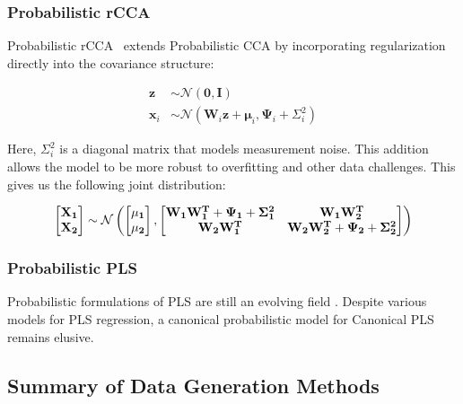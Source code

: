 \subsubsection{Probabilistic rCCA}

Probabilistic rCCA~\cite{de2003regularization} extends Probabilistic CCA by incorporating regularization directly into the covariance structure:

\begin{align}
    \mathbf{z}& \sim \mathcal{N}(\mathbf{0}, \mathbf{I})                                            \\
    \mathbf{x}_i & \sim \mathcal{N}(\mathbf{W}_i \mathbf{z} + \boldsymbol{\mu}_i, \boldsymbol{\Psi}_i + \Sigma_i^2)
\end{align}

Here, \(\Sigma_i^2\) is a diagonal matrix that models measurement noise. This addition allows the model to be more
robust to overfitting and other data challenges. This gives us the following joint distribution:

\begin{align}
    \begin{bmatrix} \bold{X_1} \\ \bold{X_2} \end{bmatrix} \sim \mathcal{N} \left( \begin{bmatrix} \bold{\mu_1} \\ \bold{\mu_2} \end{bmatrix}, \begin{bmatrix} \bold{W_1W_1^T} + \bold{\Psi_1} + \bold{\Sigma_1^2} & \bold{W_1W_2^T} \\ \bold{W_2W_1^T} & \bold{W_2W_2^T} + \bold{\Psi_2} + \bold{\Sigma_2^2} \end{bmatrix} \right)
\end{align}

\subsubsection{Probabilistic PLS}

Probabilistic formulations of PLS are still an evolving field \cite{el2018probabilistic,zheng2016probabilistic}.
Despite various models for PLS regression, a canonical probabilistic model for Canonical PLS remains elusive.

\subsection{Summary of Data Generation Methods}

